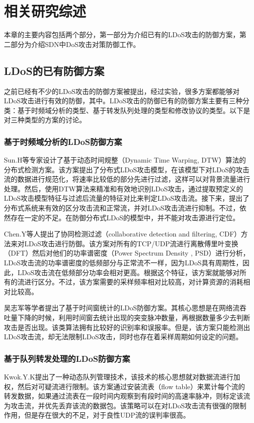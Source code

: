 \chapter{相关研究综述}
\label{cha:relatedWork}

本章的主要内容包括两个部分，第一部分为介绍已有的LDoS攻击的防御方案，第二部分为介绍SDN中DoS攻击对策防御工作。

\section{LDoS的已有防御方案}
\label{chap2:LDoSwork}
之前已经有不少的LDoS攻击的防御方案被提出，经过实验，很多方案都能够对LDoS攻击进行有效的防御，其中。LDoS攻击的防御已有的防御方案主要有三种分类：基于时频域分析的类型、基于转发队列处理的类型和修改协议的类型。以下是对三种类型的方案的讨论。


\subsection{基于时频域分析的LDoS防御方案}
\label{chap2:TFanalysis}

Sun.H\cite{b4}等专家设计了基于动态时间规整（Dynamic Time Warping, DTW）算法的分布式检测方案。该方案提出了分布式LDoS攻击模型，在该模型下对LDoS的攻击流的数据进行规范化，将速率比较低的部分先进行过滤，这样可以对背景流量进行处理。然后，使用DTW算法来精准和有效地识别LDoS攻击，通过提取预定义的LDoS攻击模型特征与过滤后流量的特征对比来判定LDoS攻击流。接下来，提出了分布式系统来有效的区分攻击流和正常流，并对LDoS攻击流进行抑制。不过，依然存在一定的不足。在防御分布式LDoS的模型中，并不能对攻击源进行定位。

Chen.Y\cite{b7}等人提出了协同检测过滤（collaborative detection and filtering, CDF）方法来对LDoS攻击进行防御。该方案对所有的TCP/UDP流进行离散傅里叶变换（DFT）然后对他们的功率谱密度（Power Spectrum Density , PSD）进行分析，LDoS攻击流的功率谱密度的低频部分与正常流不一样，因为LDoS具有周期性，因此，LDoS攻击流在低频部分功率会相对更高。根据这个特征，该方案就能够对所有的流进行区分。不过，该方案需要的采样频率相对比较高，对计算资源的消耗相对比较高。

吴志军\cite{wuLDoSdetect}等学者提出了基于时间窗统计的LDoS防御方案。其核心思想是在网络流吞吐量下降的时候，利用时间窗去统计出现的突变脉冲数量，再根据数量多少去判断攻击是否出现。该类算法拥有比较好的识别率和误报率。但是，该方案只能检测出LDoS攻击流，却无法限制LDoS攻击，同时也存在着采样周期如何设定的问题。



\subsection{基于队列转发处理的LDoS防御方案}
\label{chap2:queanalysis}
Kwok.Y.K\cite{b22}提出了一种动态队列管理技术，该技术的核心思想就对数据流进行加权，然后对可疑流进行限制。该方案通过安装流表（flow table）来累计每个流的转发数据，如果通过流表在一段时间内观察到有段时间的高速率脉冲，则标定该流为攻击流，并优先丢弃该流的数据包。该策略可以在对LDoS攻击流有很强的限制作用，但是存在很大的不足，对于良性UDP流的误判率很高。

